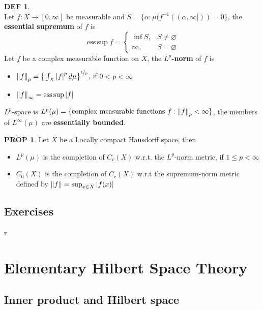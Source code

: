 \documentclass[hidelinks,10pt]{article}
\theoremstyle{definition}
\newtheorem*{defin}{DEF}
\theoremstyle{dotles}
\newenvironment{exercise}[1]
  {\renewcommand\theinnercustomex{#1}\innercustomex}
  {\endinnercustomex}
\theoremstyle{dotless}
\newtheorem{proposition}{PROP}[section]
\theoremstyle{remark}
\DeclareMathOperator{\esssup}{ess\,sup}
\begin{document}
\begin{defin}~\\
Let $f:X\to[0,\infty]$ be measurable and $S=\{\alpha:\mu(f^{-1}((\alpha,\infty]))=0\}$, the \textbf{essential supremum} of $f$ is
\[\esssup f=\begin{cases}
\inf S,&S\neq\varnothing\\
\infty,&S=\varnothing
\end{cases}\]\bigbreak
Let $f$ be a complex measurable function on $X$, the \textbf{$L^p$-norm} of $f$ is\begin{itemize}
    \item $\norm{f}_p=\big\{\int_X\abs{f}^p\,d\mu\big\}^{\nicefrac{1}{p}}$, if $0<p<\infty$
    \item $\norm{f}_\infty=\esssup\abs{f}$
\end{itemize}
$L^p$-space is $L^p(\mu)=\{\textrm{complex measurable functions }f:\norm{f}_p<\infty\}$, the members of $L^\infty(\mu)$ are \textbf{essentially bounded}.
\end{defin}

\begin{proposition}
Let $X$ be a Locally compact Hausdorff space, then\begin{itemize}
    \item $L^p(\mu)$ is the completion of $C_c(X)$ w.r.t. the $L^p$-norm metric, if $1\leq p<\infty$
    \item $C_0(X)$ is the completion of $C_c(X)$ w.r.t the supremum-norm metric defined by $\norm{f}=\sup_{x\in X}\abs{f(x)}$
\end{itemize}
\end{proposition}

\subsection*{Exercises}

\begin{exercise}{3.1}
r
\end{exercise}

\newpage

\section{Elementary Hilbert Space Theory}

\subsection{Inner product and Hilbert space}
\end{document}
